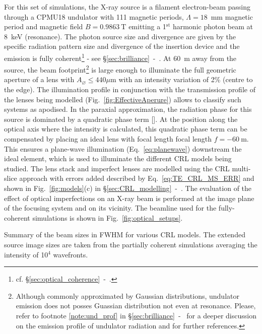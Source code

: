 \begin{refsection}
For this set of simulations, the X-ray source is a filament electron-beam passing through a CPMU18 undulator with 111 magnetic periods, $\Lambda=18$~mm magnetic period and magnetic field $B=0.9863~$T emitting a 1$^\text{st}$ harmonic photon beam at 8~keV (resonance). The photon source size and divergence are given by the specific radiation
pattern size and divergence of the insertion device and the emission is fully coherent\footnote{cf. \S\ref{sec:optical_coherence}~-~\textit{}.}  - see \S\ref{sec:brilliance}~-~\textit{}. At 60~m away from the source, the beam footprint\footnote{Although commonly approximated by Gaussian distributions, undulator emission does not posses Guassian distribution not even at resonance. Please, refer to footnote \ref{note:und_prof} in \S\ref{sec:brilliance}~-~\textit{} for a deeper discussion on the emission profile of undulator radiation and for further references.} is large enough to illuminate the full geometric aperture of a lens with $A_{\diameter}\le440 \mu\text{m}$ with an intensity variation of 2\% (centre to the edge). The illumination profile in conjunction with the transmission profile of the lenses being modelled (Fig.~\ref{fig:EffectiveAperure}) allows to classify such systems as apodised. In the paraxial approximation, the radiation phase for this source is dominated by a quadratic phase term [\cite{Chubar1999, Chubar2001b, Chubar2019}]. At the position along the optical axis where the intensity is calculated, this quadratic phase term can be compensated by placing an ideal lens with focal length focal length $f=-60~$m. This ensures a plane-wave illumination (Eq.~\ref{eq:planewave}) downstream the ideal element, which is used to illuminate the different CRL models being studied. The lens stack and imperfect lenses are modelled using the CRL multi-slice approach with errors added described by Eq.~\ref{eq:TE_CRL_MS_ERR} and shown in Fig.~\ref{fig:models}(c) in \S\ref{sec:CRL_modelling}~-~\textit{}. The evaluation of the effect of optical imperfections on an X-ray beam is performed at the image plane of the focusing system and on its vicinity. The beamline used for the fully-coherent simulations is shown in  Fig.~\ref{fig:optical_setups}.



\begin{table}[h]
\caption[FWHM of the PSF for the simulated models in Figs.~\ref{fig:CDn_vs_CDnStack}-\ref{fig:CDnS}]{Summary of the beam sizes in FWHM for various CRL models. The extended source image sizes are taken from the partially coherent simulations averaging the intensity of 10$^{4}$ wavefronts.}\label{tab:beamsizes}\small


\end{table}
\end{refsection}
